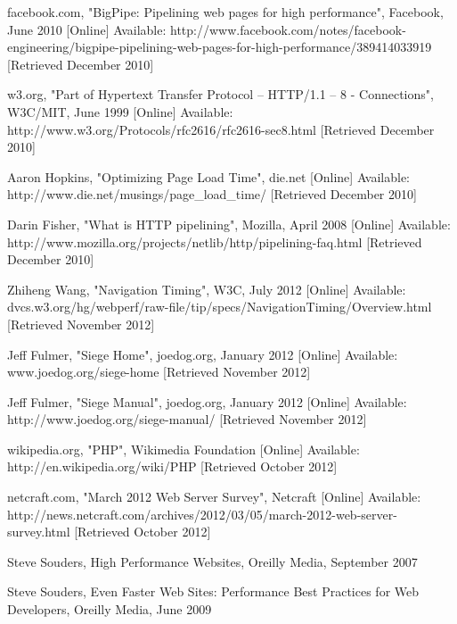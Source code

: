 \documentclass[12pt]{report}
\begin{document}
\begin{thebibliography}{2}
\doublespacing

facebook.com, "BigPipe: Pipelining web pages for high performance", Facebook, June 2010 [Online]
Available: http://www.facebook.com/notes/facebook-engineering/bigpipe-pipelining-web-pages-for-high-performance/389414033919 [Retrieved December 2010]

w3.org, "Part of Hypertext Transfer Protocol -- HTTP/1.1 – 8 - Connections", W3C/MIT, June 1999 [Online]
Available: http://www.w3.org/Protocols/rfc2616/rfc2616-sec8.html [Retrieved December 2010]

Aaron Hopkins, "Optimizing Page Load Time", die.net [Online]
Available: http://www.die.net/musings/page\_load\_time/ [Retrieved December 2010]

Darin Fisher, "What is HTTP pipelining", Mozilla, April 2008 [Online]
Available: http://www.mozilla.org/projects/netlib/http/pipelining-faq.html [Retrieved December 2010]

Zhiheng Wang, "Navigation Timing", W3C, July 2012 [Online]
Available: dvcs.w3.org/hg/webperf/raw-file/tip/specs/NavigationTiming/Overview.html [Retrieved November 2012]

Jeff Fulmer, "Siege Home",  joedog.org, January 2012 [Online]
Available: www.joedog.org/siege-home [Retrieved November 2012]

Jeff Fulmer, "Siege Manual", joedog.org, January 2012 [Online]
Available: http://www.joedog.org/siege-manual/ [Retrieved November 2012]

wikipedia.org, "PHP", Wikimedia Foundation [Online]
Available: http://en.wikipedia.org/wiki/PHP [Retrieved October 2012]

netcraft.com, "March 2012 Web Server Survey", Netcraft [Online]
Available: http://news.netcraft.com/archives/2012/03/05/march-2012-web-server-survey.html [Retrieved October 2012]

Steve Souders, High Performance Websites, Oreilly Media, September 2007

Steve Souders, Even Faster Web Sites: Performance Best Practices for Web Developers, Oreilly Media, June 2009

\end{thebibliography}
\end{document}
